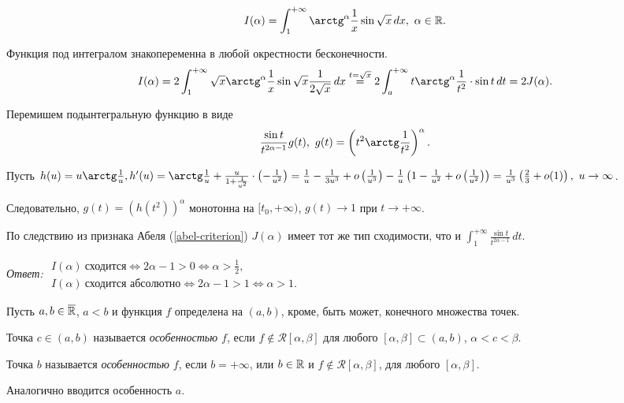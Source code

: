 \begin{example}
    \[
        I(\alpha) = \int_1^{+\infty} \arctg^\alpha \frac{1}{x} \sin \sqrt{x}\, dx, \ \alpha \in \R.
    \]
    
    \begin{solution}
        Функция под интегралом знакопеременна в любой окрестности бесконечности.
        \[
            I(\alpha) = 2\int_1^{+\infty} \sqrt{x} \arctg^\alpha \frac{1}{x} \sin \sqrt{x} \frac{1}{2\sqrt{x}}\, dx \overset{t = \sqrt{x}}{=} 2\int_a^{+\infty} t \arctg^\alpha \frac{1}{t^2} \cdot \sin t\, dt = 2 J(\alpha).
        \]

        Перемишем подынтегральную функцию в виде
        \[
            \frac{\sin t}{t^{2\alpha - 1}}g(t), \ g(t) = \left(t^2 \arctg \frac{1}{t^2}\right)^\alpha.
        \]

        Пусть $h(u) = u \arctg \frac{1}{u}, h'(u) = \arctg \frac{1}{u} + \frac{u}{1 + \frac{1}{u^2}} \cdot \left(-\frac{1}{u^2}\right) = \frac{1}{u} - \frac{1}{3u^3} + o\left(\frac{1}{u^3}\right) - \frac{1}{u}\left(1 - \frac{1}{u^2} + o\left(\frac{1}{u^2}\right)\right) = \frac{1}{u^3}\left(\frac{2}{3} + o(1)\right), \ u \to \infty$.

        Следовательно, $g(t) = \left(h(t^2)\right)^\alpha$ монотонна на $[t_0, +\infty)$, $g(t) \rightarrow 1$ при $t \rightarrow +\infty$.

        По следствию из признака Абеля (\ref{abel-criterion}) $J(\alpha)$ имеет тот же тип сходимости, что и $\int_1^{+\infty} \frac{\sin t}{t^{2\alpha - 1}}\, dt$.

        \emph{Ответ:} $\begin{array}{l}I(\alpha) \ \text{сходится} \Leftrightarrow 2\alpha - 1 > 0 \Leftrightarrow \alpha > \frac{1}{2}, \\ I(\alpha) \ \text{сходится абсолютно} \Leftrightarrow 2\alpha - 1 > 1 \Leftrightarrow \alpha > 1.\end{array}$
    \end{solution}
\end{example}

\begin{definition}
    Пусть $a, b \in \overline{\mathbb{R}}$, $a < b$ и функция $f$ определена на $(a, b)$, кроме, быть может, конечного множества точек.

    Точка $c \in (a, b)$ называется \emph{особенностью $f$}, если $f \not\in \mathcal{R}[\alpha, \beta]$ для любого $[\alpha, \beta] \subset (a, b)$, $\alpha < c < \beta$.

    Точка $b$ называется \emph{особенностью $f$}, если $b = +\infty$, или $b \in \mathbb{R}$ и $f \not\in \mathcal{R}[\alpha, \beta]$, для любого $[\alpha, \beta]$.

    Аналогично вводится особенность $a$.
\end{definition}

